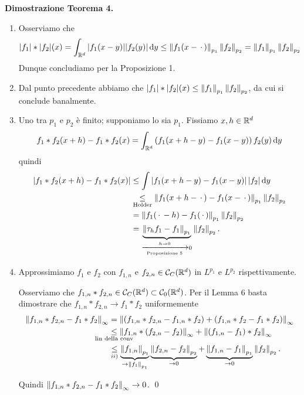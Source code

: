 \textbf{Dimostrazione Teorema 4.}
\begin{enumerate}
\item Osserviamo che
%
$$
|f_1| \ast |f_2|(x) = \int_{\mathbb R^d} |f_1(x-y)| |f_2(y)| \,\mathrm{d} y
\leq \left\lVert f_1(x - \,\cdot\,) \right\rVert_{p_1} \left\lVert f_2 \right\rVert_{p_2}
= \left\lVert f_1 \right\rVert_{p_1} \left\lVert f_2 \right\rVert_{p_2}
$$
%
Dunque concludiamo per la Proposizione 1.

\item Dal punto precedente abbiamo che $|f_1| \ast |f_2|(x) \leq \left\lVert f_1 \right\rVert_{p_1} \left\lVert f_2 \right\rVert_{p_2}$, da cui si conclude banalmente.

\item Uno tra $p_1$ e $p_2$ è finito; supponiamo lo sia $p_1$.
Fissiamo $x,h \in \mathbb R^d$
%
$$
f_1 \ast f_2(x+h) - f_1 \ast f_2(x) = \int_{\mathbb R^d} \left( f_1(x+h-y) - f_1(x-y) \right) f_2(y) \,\mathrm{d} y
$$
%
quindi
\begin{align*}
\left| f_1 \ast f_2(x+h) - f_1 \ast f_2(x) \right|
& \leq \int \left| f_1(x+h - y) - f_1(x - y) \right| | f_2| \,\mathrm{d} y  \\
& \underset{\text{Holder}}{\leq} \left\lVert f_1(x+h - \,\cdot\,) - f_1(x - \,\cdot\,) \right\rVert_{p_1} \left\lVert f_2 \right\rVert_{p_2} \\
& = \left\lVert f_1(\,\cdot\, - h) - f_1(\,\cdot\,) \right\rVert_{p_1} \left\lVert f_2 \right\rVert_{p_2} \\
& = \underbrace{\left\lVert \tau_h f_1 - f_1 \right\rVert_{p_1}}_{\xrightarrow[\text{Proposizione 5}]{h \to 0} 0} \left\lVert f_2 \right\rVert_{p_2}.
\end{align*}

\item Approssimiamo $f_1$  e $f_2$ con $f_{1,n}$ e $f_{2,n} \in \mathcal{C}_C(\mathbb R^d)$ in $L^{p_1}$ e $L^{p_2}$ rispettivamente.

Osserviamo che $f_{1,n} \ast f_{2,n} \in \mathcal{C}_C(\mathbb R^d) \subset \mathcal{C}_0(\mathbb R^d)$.
Per il Lemma 6 basta dimostrare che $f_{1,n} \ast f_{2,n} \longrightarrow f_1 \ast f_2$ uniformemente
%
\begin{align*}
\norm{f_{1,n} \ast f_{2,n} - f_1 \ast f_2}_\infty
& = \norm{\left( f_{1,n} \ast f_{2,n} - f_{1,n} \ast f_2 \right) + \left( f_{1,n} \ast f_2 - f_1 \ast f_2 \right)}_\infty \\
& \underset{\mathclap{\text{lin della conv}}}{\leq} \norm{f_{1,n} \ast \left( f_{2,n} - f_2 \right)}_\infty + \norm{\left( f_{1,n} - f_1 \right) \ast f_2}_\infty \\
& \underset{ii)}{\leq} \underbrace{\norm{f_{1,n}}_{p_1}}_{\to \norm{f_1}_{p_1}} \underbrace{\norm{f_{2,n} - f_2}_{p_2}}_{\to 0} + \underbrace{\norm{f_{1,n} - f_1}_{p_1}}_{\to 0} \norm{f_2}_{p_2}.
\end{align*}

Quindi $\left\lVert f_{1,n} \ast f_{2,n} - f_1 \ast f_2 \right\rVert_\infty \to 0$.
\qed
\end{enumerate}

